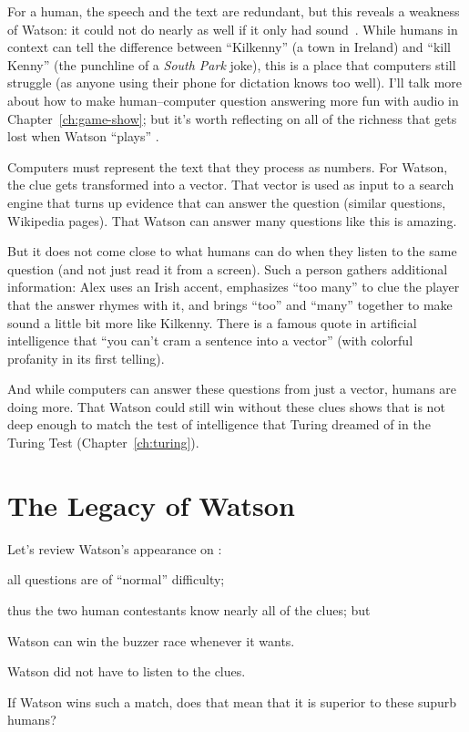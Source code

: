 For a human, the speech and the text are redundant, but this reveals a
weakness of Watson: it could not do nearly as well if it only had
sound~\citep{Peskov-19}.
%
While humans in context can tell the difference between ``Kilkenny'' (a town in
Ireland) and ``kill Kenny'' (the punchline of a \textit{South Park}
joke), this is a place that computers still struggle (as anyone using
their phone for dictation knows too well).
%
I'll talk more about how to make human--computer question answering
more fun with audio in Chapter~\ref{ch:game-show}; but it's worth
reflecting on all of the richness that gets lost when Watson ``plays''
\jeopardyp{}.

Computers must represent the text that they process as numbers.
%
For Watson, the clue  gets transformed into a
vector.
%
That vector is used as input to a search engine that turns up evidence
that can answer the question (similar questions, Wikipedia pages).
%
That Watson can answer many questions like this is amazing.


But it does not come close to what humans can do when they listen to
the same question (and not just read it from a screen).
% 
Such a person gathers additional
information: Alex uses an Irish accent, emphasizes ``too many'' to
clue the player that the answer rhymes with it, and brings ``too'' and
``many'' together to make sound a little bit more like Kilkenny.
%
There is a famous quote in artificial intelligence that ``you can't
cram a sentence into a vector'' (with colorful profanity in its first
telling).

And while computers can answer these questions from just a vector,
humans are doing more.
%
That Watson could still win without these clues shows that \jeopardy{}
is not deep enough to match the test of intelligence that Turing
dreamed of in the Turing Test (Chapter~\ref{ch:turing}).

\section{The Legacy of Watson}

Let's review Watson's appearance on \jeopardyp{}:
\begin{enumerate*}
        \item all questions are of ``normal'' difficulty;
        \item thus the two human contestants know nearly all of the clues; but
        \item Watson can win the buzzer race whenever it wants.
        \item Watson did not have to listen to the clues.
\end{enumerate*}
If Watson wins such a match, does that mean that it is superior to
these supurb humans?

